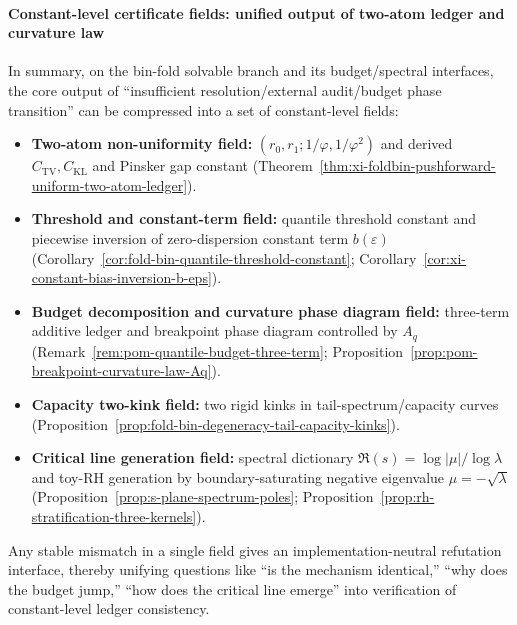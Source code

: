 \paragraph{Constant-level certificate fields: unified output of two-atom ledger and curvature law}
In summary, on the bin-fold solvable branch and its budget/spectral interfaces, the core output of ``insufficient resolution/external audit/budget phase transition'' can be compressed into a set of constant-level fields:
\begin{itemize}
  \item \textbf{Two-atom non-uniformity field:} \((r_0,r_1;1/\varphi,1/\varphi^2)\) and derived \(C_{\mathrm{TV}},C_{\mathrm{KL}}\) and Pinsker gap constant (Theorem~\ref{thm:xi-foldbin-pushforward-uniform-two-atom-ledger}).
  \item \textbf{Threshold and constant-term field:} quantile threshold constant and piecewise inversion of zero-dispersion constant term \(b(\varepsilon)\) (Corollary~\ref{cor:fold-bin-quantile-threshold-constant}; Corollary~\ref{cor:xi-constant-bias-inversion-b-eps}).
  \item \textbf{Budget decomposition and curvature phase diagram field:} three-term additive ledger and breakpoint phase diagram controlled by \(A_q\) (Remark~\ref{rem:pom-quantile-budget-three-term}; Proposition~\ref{prop:pom-breakpoint-curvature-law-Aq}).
  \item \textbf{Capacity two-kink field:} two rigid kinks in tail-spectrum/capacity curves (Proposition~\ref{prop:fold-bin-degeneracy-tail-capacity-kinks}).
  \item \textbf{Critical line generation field:} spectral dictionary \(\Re(s)=\log|\mu|/\log\lambda\) and toy-RH generation by boundary-saturating negative eigenvalue \(\mu=-\sqrt\lambda\) (Proposition~\ref{prop:s-plane-spectrum-poles}; Proposition~\ref{prop:rh-stratification-three-kernels}).
\end{itemize}
Any stable mismatch in a single field gives an implementation-neutral refutation interface, thereby unifying questions like ``is the mechanism identical,'' ``why does the budget jump,'' ``how does the critical line emerge'' into verification of constant-level ledger consistency.


